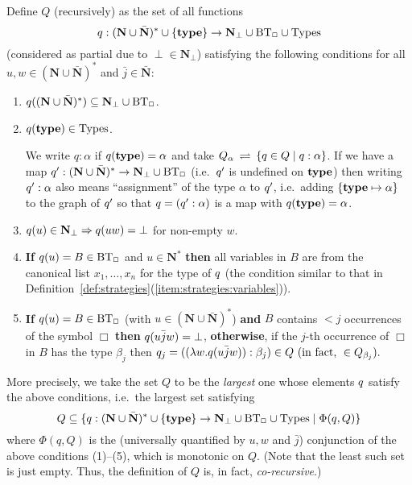 \documentclass[fleqn]{LMCS}
\theoremstyle{plain}\newtheorem{satz}[thm]{Satz}
\theoremstyle{plain}\newtheorem{hyp}[thm]{Hypothesis}
\theoremstyle{plain}\newtheorem{hyps}[thm]{Hypotheses}
\theoremstyle{definition}\newtheorem{note}[thm]{Note}
\newcommand{\setof}[1]{\{#1\}}
\newcommand{\bYdef}{\mathrel{\BYDEF}}
\newcommand{\BYDEF}{\mbox{$\hspace{.2em}\rightleftharpoons\hspace{.2em}$}}
\newcommand{\arr}{\rightarrow}
\newcommand{\Arr}{\Rightarrow}
\newcommand{\NN}{\mathbf{N}}
\newcommand{\bNN}{\bar{\NN}}
\newcommand{\Undef}{{\perp}}
\newcommand{\bj}{\bar{j}}
\newcommand{\?}{\mbox{?}}
\begin{document}
Define $Q$ (recursively) as the set of all functions 
\[
\qq:(\NN\cup\bNN)^*\cup\setof{\type}\arr \NN_\Undef\cup\BT\cup\Types
\]
(considered as partial due to $\Undef\in \NN_\Undef$) 
satisfying the following conditions for all $u,w\in(\NN\cup\bNN)^*$ and 
$\bj\in\bNN$:
\begin{enumerate}[(1)]
\item 
$\qq((\NN\cup\bNN)^*)\subseteq\NN_\Undef\cup\BT$.
\item
$q(\textrm{\bf type})\in\textrm{Types}$. 

\noindent
We write $q:\alpha$ if $q(\textrm{\bf type})=\alpha$ and take 
$Q_\alpha\bYdef\setof{q\in Q\mid q:\alpha}$.  
If we have a map $\qq':(\NN\cup\bNN)^*\arr \NN_\Undef\cup\BT$ 
(i.e.\ $q'$ is undefined on $\textrm{\bf type}$) then writing 
$q':\alpha$ also means ``assignment'' of the type $\alpha$ to $q'$, i.e.\ 
adding $\setof{\type\mapsto\alpha}$ to the graph of $q'$ so that 
$q=(q':\alpha)$ is a map with $q(\textrm{\bf type})=\alpha$. 
\item
$\qq(u)\in \NN_\Undef\Arr \qq(uw)=\Undef$ for non-empty $w$. 


\item
{\bf If} $q(u)=B\in\mbox{BT}_\Box $ and $u\in\NN^*$ {\bf then} all variables in $B$ are 
from the canonical list $x_1,\ldots,x_n$ for the type of $q$ 
(the condition similar to that in 
Definition~\ref{def:strategies}(\ref{item:strategies:variables})).

\item
{\bf If} $q(u)=B\in\mbox{BT}_\Box$ (with $u\in(\NN\cup\bNN)^*$) 
{\bf and} $B$ contains ${}<j$ occurrences 
of the symbol $\Box$ 
{\bf then} 
$\qq(u\bj w)=\Undef$, 
{\bf otherwise}, if the $j$-th occurrence of $\Box$ in $B$ has the type 
$\beta_j$ then 
$
q_j=((\lambda w.\qq(u\bj w)):\beta_j)\in Q
\ (\textrm{in fact, }{}\in Q_{\beta_j}). 
$
\end{enumerate}
More precisely, we take the set $Q$ to be the \emph{largest} 
one whose elements $q$ satisfy the above conditions, i.e.\ the largest set  
satisfying 
\[
Q\subseteq\setof{\qq:(\NN\cup\bNN)^*\cup\setof{\type}\arr \NN_\Undef\cup\BT\cup\Types
\mid\Phi(q,Q)}
\] 
where $\Phi(q,Q)$ is the (universally quantified by $u,w$ and $\bj$) 
conjunction of the above conditions (1)--(5), which is 
monotonic on $Q$. 
(Note that the least such set is just empty. 
Thus, the definition of $Q$ is, in fact, \emph{co-recursive}.) 
\end{document}
